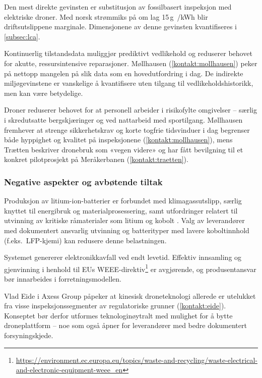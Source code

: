Den mest direkte gevinsten er substitusjon av fossilbasert inspeksjon med elektriske droner. Med norsk strømmiks på om lag 15\,g~/kWh \parencite{nve_kraftproduksjon} blir driftsutslippene marginale. Dimensjonene av denne gevinsten kvantifiseres i \cref{subsec:lca}.

Kontinuerlig tilstandsdata muliggjør prediktivt vedlikehold og reduserer behovet for akutte, ressursintensive reparasjoner. Møllhausen (\cref{kontakt:mollhausen}) peker på nettopp mangelen på slik data som en hovedutfordring i dag. De indirekte miljøgevinstene er vanskelige å kvantifisere uten tilgang til vedlikeholdshistorikk, men kan være betydelige.

Droner reduserer behovet for at personell arbeider i risikofylte omgivelser -- særlig i skredutsatte bergskjæringer og ved nattarbeid med sportilgang. Møllhausen fremhever at strenge sikkerhetskrav og korte togfrie tidsvinduer i dag begrenser både hyppighet og kvalitet på inspeksjonene (\cref{kontakt:mollhausen}), mens Trætten beskriver dronebruk som «vegen videre» og har fått bevilgning til et konkret pilotprosjekt på Meråkerbanen (\cref{kontakt:traetten}).
\subsubsection{Negative aspekter og avbøtende tiltak}

Produksjon av litium-ion-batterier er forbundet med klimagassutslipp, særlig knyttet til energibruk og materialprosessering, samt utfordringer relatert til utvinning av kritiske råmaterialer som litium og kobolt \cite{clemente_meta_analysis_2025}. Valg av leverandører med dokumentert ansvarlig utvinning og batterityper med lavere koboltinnhold (f.eks.\ LFP-kjemi) kan redusere denne belastningen.

Systemet genererer elektronikkavfall ved endt levetid. Effektiv innsamling og gjenvinning i henhold til EUs WEEE-direktiv\footnote{\url{https://environment.ec.europa.eu/topics/waste-and-recycling/waste-electrical-and-electronic-equipment-weee_en}} er avgjørende, og produsentansvar bør innarbeides i forretningsmodellen.

Vlad Eide i Axess Group påpeker at kinesisk droneteknologi allerede er utelukket fra visse inspeksjonssegmenter av regulatoriske grunner (\cref{kontakt:eide}). Konseptet bør derfor utformes teknologinøytralt med mulighet for å bytte droneplattform -- noe som også åpner for leverandører med bedre dokumentert forsyningskjede.

